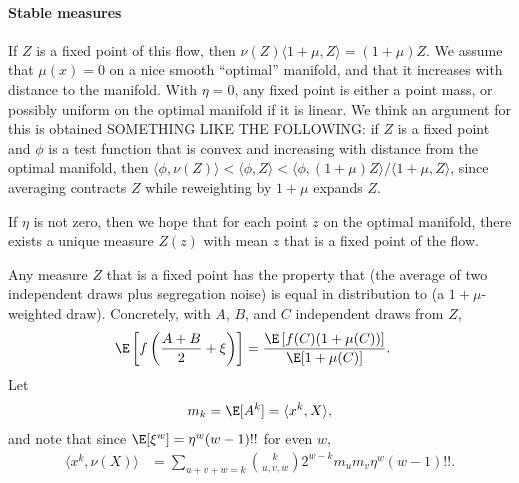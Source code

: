 \documentclass{article}
\newcommand{\ip}[2]{\langle #1, #2 \rangle}
\begin{document}
\paragraph{Stable measures}
If $Z$ is a fixed point of this flow,
then $\nu(Z)\ip{1+\mu}{Z} = (1+\mu)Z$.
We assume that $\mu(x) = 0$ on a nice smooth ``optimal'' manifold,
and that it increases with distance to the manifold.
With $\eta = 0$,
any fixed point is either a point mass,
or possibly uniform on the optimal manifold if it is linear.
We think an argument for this is obtained SOMETHING LIKE THE FOLLOWING: 
if $Z$ is a fixed point
and $\phi$ is a test function that is convex and increasing with distance from the optimal manifold,
then $\ip{\phi}{\nu(Z)} < \ip{\phi}{Z} < \ip{\phi}{(1+\mu)Z}/\ip{1+\mu}{Z}$,
since averaging contracts $Z$ while reweighting by $1+\mu$ expands $Z$.

If $\eta$ is not zero, then we hope that for each point $z$ on the optimal manifold,
there exists a unique measure $Z(z)$ with mean $z$ that is a fixed point
of the flow.

Any measure $Z$ that is a fixed point has the property that
(the average of two independent draws plus segregation noise)
is equal in distribution to
(a $1+\mu$-weighted draw).
Concretely, with $A$, $B$, and $C$ independent draws from $Z$,
$$\begin{aligned}
    \E\left[ f\left( \frac{A+B}{2} + \xi \right) \right]
    &=
    \frac{\E\left[ f(C) (1+\mu(C)) \right]}{\E[1+\mu(C)]} .
\end{aligned}$$
Let
$$\begin{aligned}
    m_k = \E[A^k] = \ip{x^k}{X} ,
\end{aligned}$$
and note that since $\E[\xi^w] = \eta^w (w-1)!!$ for even $w$,
$$\begin{aligned}
    \ip{x^k}{\nu(X)}
    &=
    \sum_{u+v+w=k} \binom{k}{u,v,w} 2^{w-k} m_u m_v \eta^w (w-1)!!.
\end{aligned}$$
\end{document}
